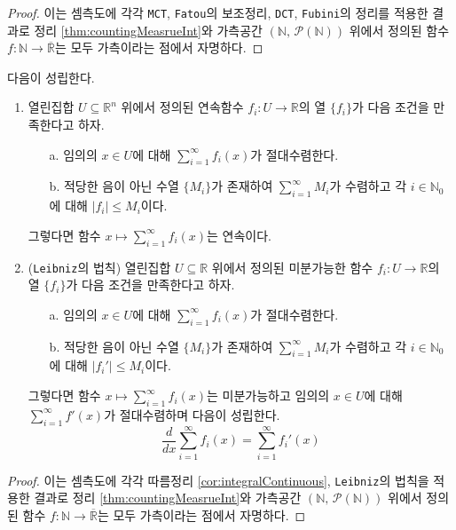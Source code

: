 \begin{proof}
    이는 셈측도에 각각 \texttt{MCT}, \texttt{Fatou}의 보조정리, \texttt{DCT}, \texttt{Fubini}의 정리를 적용한 결과로 정리 \ref{thm:countingMeasrueInt}와 가측공간 $(\mathbb{N},\,\mathcal{P}(\mathbb{N}))$ 위에서 정의된 함수 $f:\mathbb{N}\to\overline{\mathbb{R}}$는 모두 가측이라는 점에서 자명하다.
\end{proof}

\begin{corollary}
    다음이 성립한다.
    \begin{enumerate}
        \item 열린집합 $U\subseteq\mathbb{R}^n$ 위에서 정의된 연속함수 $f_i:U\to\mathbb{R}$의 열 $\{f_i\}$가 다음 조건을 만족한다고 하자.
        \begin{enumerate}
            \item[a.] 임의의 $x\in U$에 대해 $\sum_{i=1}^\infty f_i(x)$가 절대수렴한다.
            \item[b.] 적당한 음이 아닌 수열 $\{M_i\}$가 존재하여 $\sum_{i=1}^\infty M_i$가 수렴하고 각 $i\in\mathbb{N}_0$에 대해 $|f_i|\leq M_i$이다.
        \end{enumerate}
        그렇다면 함수 $x\mapsto\sum_{i=1}^\infty f_i(x)$는 연속이다.
        \item (\texttt{Leibniz}의 법칙) 열린집합 $U\subseteq\mathbb{R}$ 위에서 정의된 미분가능한 함수 $f_i:U\to\mathbb{R}$의 열 $\{f_i\}$가 다음 조건을 만족한다고 하자.
        \begin{enumerate}
            \item[a.] 임의의 $x\in U$에 대해 $\sum_{i=1}^\infty f_i(x)$가 절대수렴한다.
            \item[b.] 적당한 음이 아닌 수열 $\{M_i\}$가 존재하여 $\sum_{i=1}^\infty M_i$가 수렴하고 각 $i\in\mathbb{N}_0$에 대해 $|f_i'|\leq M_i$이다.
        \end{enumerate}
        그렇다면 함수 $x\mapsto\sum_{i=1}^\infty f_i(x)$는 미분가능하고 임의의 $x\in U$에 대해 $\sum_{i=1}^\infty f'(x)$가 절대수렴하며 다음이 성립한다.
        \begin{equation*}
            \frac{d}{dx}\sum_{i=1}^\infty f_i(x)=\sum_{i=1}^\infty f_i'(x)
        \end{equation*}
    \end{enumerate}
\end{corollary}

\begin{proof}
    이는 셈측도에 각각 따름정리 \ref{cor:integralContinuous}, \texttt{Leibniz}의 법칙을 적용한 결과로 정리 \ref{thm:countingMeasrueInt}와 가측공간 $(\mathbb{N},\,\mathcal{P}(\mathbb{N}))$ 위에서 정의된 함수 $f:\mathbb{N}\to\overline{\mathbb{R}}$는 모두 가측이라는 점에서 자명하다.
\end{proof}

